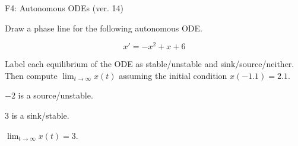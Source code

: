 \begin{exercise}
  \begin{exerciseTitle}F4: Autonomous ODEs (ver. 14)\end{exerciseTitle}
  \begin{exerciseStatement}
    

      Draw a phase line for the following 
      autonomous ODE.
    

    
\[x'= -x^{2} + x + 6\]

    

      Label each equilibrium of the ODE
      as stable/unstable and sink/source/neither.
      Then compute \(\lim_{t\to\infty}x(t)\)
      assuming the initial condition
      \(x( -1.1 )= 2.1\).
    

  \end{exerciseStatement}
  \begin{exerciseAnswer}
    

      \(-2\) is a source/unstable.
      
      \(3\) is a sink/stable.
    

    

      \(\lim_{t\to\infty}x(t)=3\).
    

  \end{exerciseAnswer}
\end{exercise}